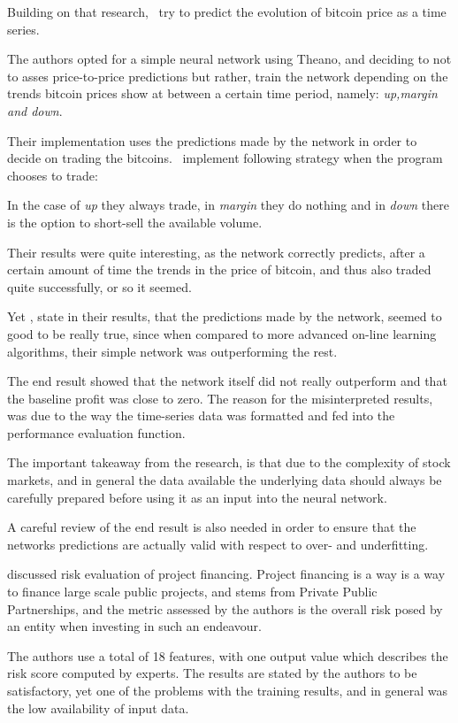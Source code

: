 \documentclass[12pt]{article}
\begin{document}
Building on that research,~\citet{bitcoinNN} try to predict the evolution of bitcoin price as a time series. 

The authors opted for a simple neural network using Theano, and deciding to not to asses price-to-price predictions but rather, train the network depending on the trends bitcoin prices show at between a certain time period, namely: \textit{up,margin and down}. 

Their implementation uses the predictions made by the network in order to decide on trading the bitcoins.~\citet{bitcoinNN} implement following strategy when the program chooses to trade: 

In the case of \textit{up} they always trade, in \textit{margin} they do nothing and in \textit{down} there is the option to short-sell the available volume. 

Their results were quite interesting, as the network correctly predicts, after a certain amount of time the trends in the price of bitcoin, and thus also traded quite successfully, or so it seemed.

Yet \citet{bitcoinNN}, state in their results, that the predictions made by the network, seemed to good to be really true, since when compared to more advanced on-line learning algorithms, their simple network was outperforming the rest. 

The end result showed that the network itself did not really outperform and that the baseline profit was close to zero. The reason for the misinterpreted results, was due to the way the time-series data was formatted and fed into the performance evaluation function. 

The important takeaway from the research, is that due to the complexity of stock markets, and in general the data available the underlying data should always be carefully prepared before using it as an input into the neural network. 

A careful review of the end result is also needed in order to ensure that the networks predictions are actually valid with respect to over- and underfitting.

\citet{04443437.pdf} discussed risk evaluation of project financing. Project financing is a way is a way to finance large scale public projects, and stems from Private Public Partnerships, and the metric assessed by the authors is the overall risk posed by an entity when investing in such an endeavour. 

The authors use a total of 18 features, with one output value which describes the risk score computed by experts. The results are stated by the authors to be satisfactory, yet one of the problems with the training results, and in general was the low availability of input data. 
\end{document}
